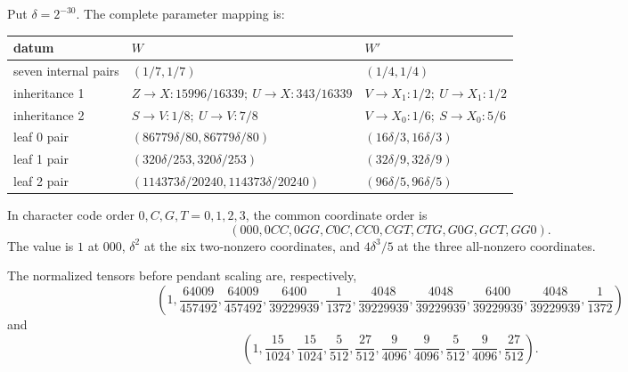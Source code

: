 \documentclass[11pt]{article}
\theoremstyle{remark}
\begin{document}
Put \(\delta=2^{-30}\).  The complete parameter mapping is:
\begin{center}
\small
\begin{tabular}{L{.18\linewidth}L{.35\linewidth}L{.35\linewidth}}
\toprule
datum & \(W\) & \(W'\)\\
\midrule
seven internal pairs
& \((1/7,1/7)\)
& \((1/4,1/4)\)\\
inheritance 1
& \(Z\to X:15996/16339;\ U\to X:343/16339\)
& \(V\to X_1:1/2;\ U\to X_1:1/2\)\\
inheritance 2
& \(S\to V:1/8;\ U\to V:7/8\)
& \(V\to X_0:1/6;\ S\to X_0:5/6\)\\
leaf 0 pair
& \((86779\delta/80,86779\delta/80)\)
& \((16\delta/3,16\delta/3)\)\\
leaf 1 pair
& \((320\delta/253,320\delta/253)\)
& \((32\delta/9,32\delta/9)\)\\
leaf 2 pair
& \((114373\delta/20240,114373\delta/20240)\)
& \((96\delta/5,96\delta/5)\)\\
\bottomrule
\end{tabular}
\end{center}

In character code order \(0,C,G,T=0,1,2,3\), the common coordinate order is
\[
(000,0CC,0GG,C0C,CC0,CGT,CTG,G0G,GCT,GG0).
\]
The value is \(1\) at \(000\), \(\delta^2\) at the six two-nonzero
coordinates, and \(4\delta^3/5\) at the three all-nonzero coordinates.

The normalized tensors before pendant scaling are, respectively,
\[
\left(1,\frac{64009}{457492},\frac{64009}{457492},
\frac{6400}{39229939},\frac1{1372},
\frac{4048}{39229939},\frac{4048}{39229939},
\frac{6400}{39229939},\frac{4048}{39229939},\frac1{1372}\right)
\]
and
\[
\left(1,\frac{15}{1024},\frac{15}{1024},\frac5{512},\frac{27}{512},
\frac9{4096},\frac9{4096},\frac5{512},\frac9{4096},\frac{27}{512}\right).
\]
\end{document}
